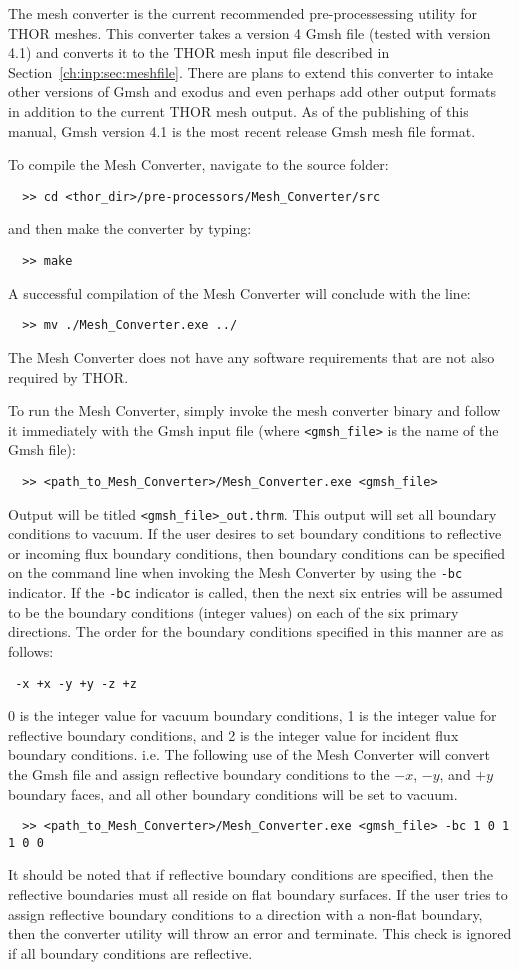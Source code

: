 The mesh converter is the current recommended pre-processessing utility for THOR meshes.
This converter takes a version 4 Gmsh file (tested with version 4.1) and converts it to the THOR mesh input file described in Section~\ref{ch:inp:sec:meshfile}.
There are plans to extend this converter to intake other versions of Gmsh and exodus and even perhaps add other output formats in addition to the current THOR mesh output.
As of the publishing of this manual, Gmsh version 4.1 is the most recent release Gmsh mesh file format.

To compile the Mesh Converter, navigate to the source folder:
\begin{verbatim}
  >> cd <thor_dir>/pre-processors/Mesh_Converter/src
\end{verbatim}
and then make the converter by typing:
\begin{verbatim}
  >> make
\end{verbatim}
A successful compilation of the Mesh Converter will conclude with the line:
\begin{verbatim}
  >> mv ./Mesh_Converter.exe ../
\end{verbatim}
The Mesh Converter does not have any software requirements that are not also required by THOR.

To run the Mesh Converter, simply invoke the mesh converter binary and follow it immediately with the Gmsh input file (where \verb"<gmsh_file>" is the name of the Gmsh file):
\begin{verbatim}
  >> <path_to_Mesh_Converter>/Mesh_Converter.exe <gmsh_file>
\end{verbatim}
Output will be titled \verb"<gmsh_file>_out.thrm".
This output will set all boundary conditions to vacuum.
If the user desires to set boundary conditions to reflective or incoming flux boundary conditions, then boundary conditions can be specified on the command line when invoking the Mesh Converter by using the \verb"-bc" indicator.
If the \verb"-bc" indicator is called, then the next six entries will be assumed to be the boundary conditions (integer values) on each of the six primary directions.
The order for the boundary conditions specified in this manner are as follows:
\begin{verbatim}
 -x +x -y +y -z +z
\end{verbatim}
0 is the integer value for vacuum boundary conditions, 1 is the integer value for reflective boundary conditions, and 2 is the integer value for incident flux boundary conditions.
i.e. The following use of the Mesh Converter will convert the Gmsh file and assign reflective boundary conditions to the $-x$, $-y$, and $+y$ boundary faces, and all other boundary conditions will be set to vacuum.
\begin{verbatim}
  >> <path_to_Mesh_Converter>/Mesh_Converter.exe <gmsh_file> -bc 1 0 1 1 0 0
\end{verbatim}
It should be noted that if reflective boundary conditions are specified, then the reflective boundaries must all reside on flat boundary surfaces.
If the user tries to assign reflective boundary conditions to a direction with a non-flat boundary, then the converter utility will throw an error and terminate.
This check is ignored if all boundary conditions are reflective.

